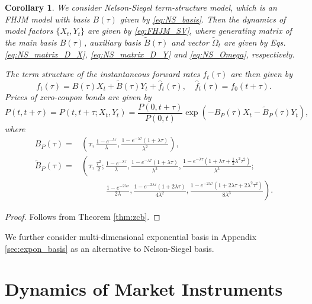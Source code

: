 \documentclass[pdftex,11pt,a4paper] {article}
\newtheorem{corollary}{Corollary}[section]
\begin{document}
\begin{corollary}\label{thm:Nelson_Siegel}
We consider Nelson-Siegel term-structure model, which is an FHJM model with basis $B(\tau)$ given by \eqref{eq:NS_basis}. Then the dynamics of model factors $\{X_t, Y_t\}$ are given by \eqref{eq:FHJM_SV}, where generating matrix of the main basis $B(\tau)$, auxiliary basis $\tilde B(\tau)$ and vector $\tilde\Omega_t$ are given by Eqs. \eqref{eq:NS_matrix_D_X}, \eqref{eq:NS_matrix_D_Y} and \eqref{eq:NS_Omega}, respectively. 

The term structure of the instantaneous forward rates $f_t(\tau)$ are then given by
\begin{equation*}
f_{t}(\tau) = B(\tau) X_{t} + \tilde{B}(\tau) Y_{t}  +  \hat f_t(\tau),\quad \hat f_t(\tau)=f_{0}(t+\tau).
\end{equation*}
Prices of zero-coupon bonds are given by
\begin{equation}\label{eq:NS_zcb1}
P(t,t+\tau) = P(t,t+\tau; X_t, Y_t) = \frac{P(0,t+\tau)}{P(0,t)}\exp\left(-B_P(\tau) X_{t} - \tilde{B}_P(\tau) Y_{t}\right),
\end{equation}
where 
\begin{equation*}
\begin{split}
B_P(\tau)=&\left(\tau,\frac{1-e^{-\lambda\tau}}{\lambda},\frac{1-e^{-\lambda\tau}(1+\lambda\tau)}{\lambda^2}\right),\\
\tilde{B}_P(\tau)=&\left(
\tau,\frac{\tau^2}{2}; 
\frac{1-e^{-\lambda\tau}}{\lambda},\frac{1-e^{-\lambda\tau}(1+\lambda\tau)}{\lambda^2},
\frac{1-e^{-\lambda\tau}(1+\lambda\tau+\frac 12\lambda^2\tau^2)}{\lambda^3};\right. \\
&\qquad\quad\left.\frac{1-e^{-2\lambda\tau}}{2\lambda},\frac{1-e^{-2\lambda\tau}(1+2\lambda\tau)}{4\lambda^2},
\frac{1-e^{-2\lambda\tau}(1+2\lambda\tau+2\lambda^2\tau^2)}{8\lambda^3}\right).
\end{split}
\end{equation*}
\end{corollary}
\begin{proof} Follows from Theorem \ref{thm:zcb}.
\end{proof}

We further consider multi-dimensional exponential basis in Appendix \ref{sec:expon_basis} as an alternative to Nelson-Siegel basis.



\section{Dynamics of Market Instruments}\label{sec::market_instrum}
\end{document}
